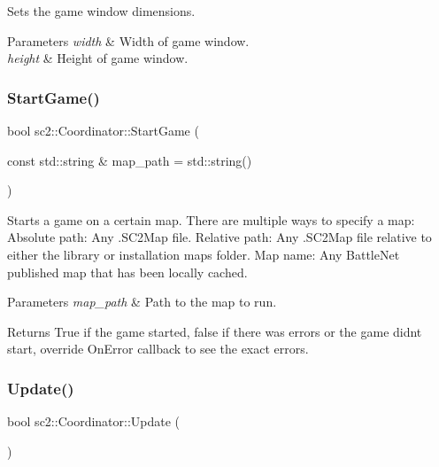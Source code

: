 Sets the game window dimensions. 
\begin{DoxyParams}{Parameters}
{\em width} & Width of game window. \\
\hline
{\em height} & Height of game window. \\
\hline
\end{DoxyParams}
\mbox{\label{classsc2_1_1_coordinator_a32ea6e639a39ec1fc813dffa2993d5b1}} 
\subsubsection{\texorpdfstring{Start\+Game()}{StartGame()}}
{\footnotesize\ttfamily bool sc2\+::\+Coordinator\+::\+Start\+Game (\begin{DoxyParamCaption}\item[{const std\+::string \&}]{map\+\_\+path = {\ttfamily std\+:\+:string()} }\end{DoxyParamCaption})}

Starts a game on a certain map. There are multiple ways to specify a map\+: Absolute path\+: Any .S\+C2\+Map file. Relative path\+: Any .S\+C2\+Map file relative to either the library or installation maps folder. Map name\+: Any Battle\+Net published map that has been locally cached. 
\begin{DoxyParams}{Parameters}
{\em map\+\_\+path} & Path to the map to run. \\
\hline
\end{DoxyParams}
\begin{DoxyReturn}{Returns}
True if the game started, false if there was errors or the game didn\textquotesingle{}t start, override On\+Error callback to see the exact errors. 
\end{DoxyReturn}
\mbox{\label{classsc2_1_1_coordinator_af70ba5246f9d447eb8a69cd76d364eee}} 
\subsubsection{\texorpdfstring{Update()}{Update()}}
{\footnotesize\ttfamily bool sc2\+::\+Coordinator\+::\+Update (\begin{DoxyParamCaption}{ }\end{DoxyParamCaption})}

